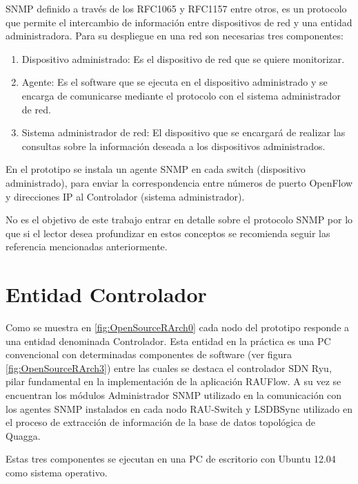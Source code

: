 SNMP definido a través de los RFC1065 \citep{rose1990structure} y RFC1157 \citep{case1989simple} entre otros, es un protocolo que permite el intercambio de información entre dispositivos de red y una entidad administradora. Para su despliegue en una red son necesarias tres componentes: 

\begin{enumerate}

\item Dispositivo administrado: Es el dispositivo de red que se quiere monitorizar.

\item Agente: Es el software que se ejecuta en el dispositivo administrado y se encarga de comunicarse mediante el protocolo con el sistema administrador de red.

\item Sistema administrador de red: El dispositivo que se encargar\'a de realizar las consultas sobre la información deseada a los dispositivos administrados.

\end{enumerate}	

En el prototipo se instala un agente SNMP en cada switch (dispositivo administrado), para enviar la correspondencia entre números de puerto OpenFlow y direcciones IP al Controlador (sistema administrador).

No es el objetivo de este trabajo entrar en detalle sobre el protocolo SNMP por lo que si el lector desea profundizar en estos conceptos se recomienda seguir las referencia mencionadas anteriormente.

\section{Entidad Controlador}
Como se muestra en \ref{fig:OpenSourceRArch0} cada nodo del prototipo responde a una entidad denominada Controlador. Esta entidad en la pr\'actica es una PC convencional con determinadas componentes de software (ver figura \ref{fig:OpenSourceRArch3}) entre las cuales se destaca el controlador SDN Ryu, pilar fundamental en la implementaci\'on de la aplicaci\'on RAUFlow. A su vez se encuentran los módulos Administrador SNMP utilizado en la comunicaci\'on con los agentes SNMP instalados en cada nodo RAU-Switch y LSDBSync utilizado en el proceso de extracci\'on de informaci\'on de la base de datos topol\'ogica de Quagga. 

Estas tres componentes se ejecutan en una PC de escritorio con Ubuntu 12.04 como sistema operativo. 


